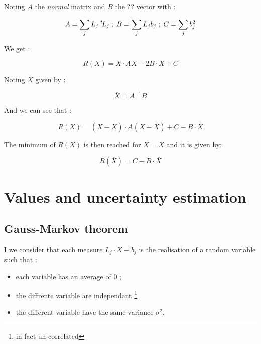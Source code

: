 Noting $A$ the \emph{normal} matrix and $B$ the ?? vector  with :

\begin{equation}
	A =   \sum_j L_j  \; ^{t} \! L_j  \; ; \;  B =\sum_j L_j b_j  \; ; \; C =  \sum_j b_j ^2
\end{equation}

We get :

\begin{equation}
	R(X) =  X \cdot A X - 2 B \cdot X +  C
\end{equation}


Noting $\overline X$ given by :

\begin{equation}
	\overline X = A^{-1} B \label{LstSq:Sol}
\end{equation}

And we can see that :

\begin{equation}
	R(X) =  (X-\overline X ) \cdot A  (X-\overline X )   +  C - B \cdot \overline X 
\end{equation}

The minimum of $R(X)$ is then reached for $X=\overline X$ and it is given by:

\begin{equation}
	R(\overline X) =    C - B \cdot \overline X \label{Lst:Res:Min}
\end{equation}



\section{Values and uncertainty estimation}

\subsection{Gauss-Markov theorem}
I we consider that each measure $L_j \cdot X - b_j$ is the realisation
of a random variable  such that :

\begin{itemize}
    \item each variable has an average of $0$ ;
    \item  the diffrente variable are independant \footnote{in fact un-correlated}
    \item  the different variable have  the same variance $\sigma ^2$.
\end{itemize}

